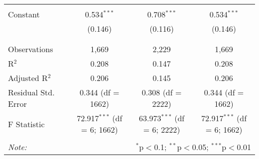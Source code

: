 \documentclass{article}
\begin{document}
\begin{table}[!htbp]
\begin{tabular}{@{\extracolsep{5pt}}lccc}
  & & & \\ 
 Constant & 0.534$^{***}$ & 0.708$^{***}$ & 0.534$^{***}$ \\ 
  & (0.146) & (0.116) & (0.146) \\ 
  & & & \\ 
\hline \\[-1.8ex] 
Observations & 1,669 & 2,229 & 1,669 \\ 
R$^{2}$ & 0.208 & 0.147 & 0.208 \\ 
Adjusted R$^{2}$ & 0.206 & 0.145 & 0.206 \\ 
Residual Std. Error & 0.344 (df = 1662) & 0.308 (df = 2222) & 0.344 (df = 1662) \\ 
F Statistic & 72.917$^{***}$ (df = 6; 1662) & 63.973$^{***}$ (df = 6; 2222) & 72.917$^{***}$ (df = 6; 1662) \\ 
\hline 
\hline \\[-1.8ex] 
\textit{Note:}  & \multicolumn{3}{r}{$^{*}$p$<$0.1; $^{**}$p$<$0.05; $^{***}$p$<$0.01} \\ 
\end{tabular} 
\end{table} 
\end{document}
